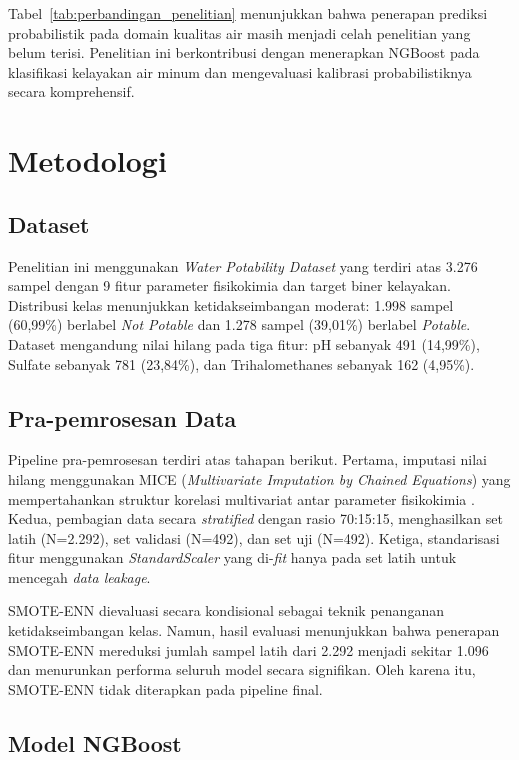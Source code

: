 \documentclass[metlit,article,accept,pdftex,moreauthors]{Definitions/mdpi}
\begin{document}
Tabel~\ref{tab:perbandingan_penelitian} menunjukkan bahwa penerapan prediksi probabilistik pada domain kualitas air masih menjadi celah penelitian yang belum terisi. Penelitian ini berkontribusi dengan menerapkan NGBoost pada klasifikasi kelayakan air minum dan mengevaluasi kalibrasi probabilistiknya secara komprehensif.

\section{Metodologi}

\subsection{Dataset}

Penelitian ini menggunakan \textit{Water Potability Dataset} \cite{kadiwal2021water} yang terdiri atas 3.276 sampel dengan 9 fitur parameter fisikokimia dan target biner kelayakan. Distribusi kelas menunjukkan ketidakseimbangan moderat: 1.998 sampel (60,99\%) berlabel \textit{Not Potable} dan 1.278 sampel (39,01\%) berlabel \textit{Potable}. Dataset mengandung nilai hilang pada tiga fitur: pH sebanyak 491 (14,99\%), Sulfate sebanyak 781 (23,84\%), dan Trihalomethanes sebanyak 162 (4,95\%).

\subsection{Pra-pemrosesan Data}

Pipeline pra-pemrosesan terdiri atas tahapan berikut. Pertama, imputasi nilai hilang menggunakan MICE (\textit{Multivariate Imputation by Chained Equations}) yang mempertahankan struktur korelasi multivariat antar parameter fisikokimia \cite{barrabes2025advances}. Kedua, pembagian data secara \textit{stratified} dengan rasio 70:15:15, menghasilkan set latih (N=2.292), set validasi (N=492), dan set uji (N=492). Ketiga, standarisasi fitur menggunakan \textit{StandardScaler} yang di-\textit{fit} hanya pada set latih untuk mencegah \textit{data leakage}.

SMOTE-ENN dievaluasi secara kondisional sebagai teknik penanganan ketidakseimbangan kelas. Namun, hasil evaluasi menunjukkan bahwa penerapan SMOTE-ENN mereduksi jumlah sampel latih dari 2.292 menjadi sekitar 1.096 dan menurunkan performa seluruh model secara signifikan. Oleh karena itu, SMOTE-ENN tidak diterapkan pada pipeline final.

\subsection{Model NGBoost}
\end{document}
